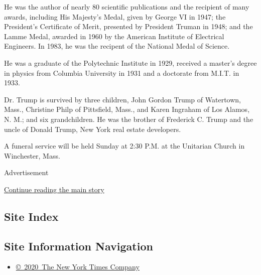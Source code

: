 He was the author of nearly 80 scientific publications and the recipient
of many awards, including His Majesty's Medal, given by George VI in
1947; the President's Certificate of Merit, presented by President
Truman in 1948; and the Lamme Medal, awarded in 1960 by the American
Institute of Electrical Engineers. In 1983, he was the recipent of the
National Medal of Science.

He was a graduate of the Polytechnic Institute in 1929, received a
master's degree in physics from Columbia University in 1931 and a
doctorate from M.I.T. in 1933.

Dr. Trump is survived by three children, John Gordon Trump of Watertown,
Mass., Christine Philp of Pittsfield, Mass., and Karen Ingraham of Los
Alamos, N. M.; and six grandchildren. He was the brother of Frederick C.
Trump and the uncle of Donald Trump, New York real estate developers.

A funeral service will be held Sunday at 2:30 P.M. at the Unitarian
Church in Winchester, Mass.

Advertisement

\protect\hyperlink{after-bottom}{Continue reading the main story}

\hypertarget{site-index}{%
\subsection{Site Index}\label{site-index}}

\hypertarget{site-information-navigation}{%
\subsection{Site Information
Navigation}\label{site-information-navigation}}

\begin{itemize}
\tightlist
\item
  \href{https://help.nytimes3xbfgragh.onion/hc/en-us/articles/115014792127-Copyright-notice}{©~2020~The
  New York Times Company}
\end{itemize}


